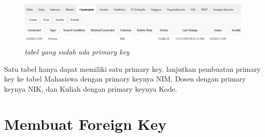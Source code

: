 \begin{enumerate}
    \begin{figure}[!htbp]
        \centering
        \includegraphics[scale=0.7]{figure/tabel_yang_sudah_ada_primary_key.PNG}
        \caption{\textit{tabel yang sudah ada primary key}}
        \label{fig:my_label}
    \end{figure}\par
    
    Satu tabel hanya dapat memiliki satu primary key.  lanjutkan pembuatan primary key ke tabel Mahasiswa dengan primary keynya NIM, Dosen dengan primary keynya NIK, dan Kuliah dengan primary keynya Kode.\par
    
\end{enumerate}

\section{Membuat Foreign Key}


